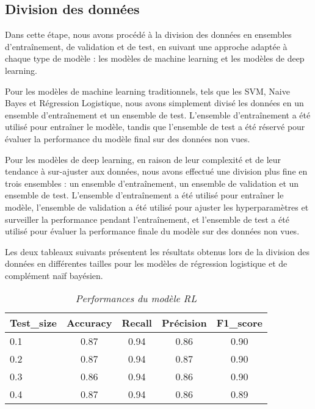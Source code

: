  
\subsection{Division des données}
Dans cette étape, nous avons procédé à la division des données en ensembles d'entraînement, de validation et de test, en suivant une approche adaptée à chaque type de modèle : les modèles de machine learning et les modèles de deep learning.

Pour les modèles de machine learning traditionnels, tels que les SVM, Naive Bayes et Régression Logistique, nous avons simplement divisé les données en un ensemble d'entraînement et un ensemble de test. L'ensemble d'entraînement a été utilisé pour entraîner le modèle, tandis que l'ensemble de test a été réservé pour évaluer la performance du modèle final sur des données non vues.

Pour les modèles de deep learning, en raison de leur complexité et de leur tendance à sur-ajuster aux données, nous avons effectué une division plus fine en trois ensembles : un ensemble d'entraînement, un ensemble de validation et un ensemble de test. L'ensemble d'entraînement a été utilisé pour entraîner le modèle, l'ensemble de validation a été utilisé pour ajuster les hyperparamètres et surveiller la performance pendant l'entraînement, et l'ensemble de test a été utilisé pour évaluer la performance finale du modèle sur des données non vues.

Les deux tableaux suivants présentent les résultats obtenus lors de la division des données en différentes tailles pour les modèles de régression logistique et de complément naïf bayésien. 

\begin{table}[h!]
    \centering
    \caption{\textit{Performances du modèle RL}}
    \begin{tabular}{lcccc}
        \toprule
        Test\_size & Accuracy & Recall & Précision & F1\_score \\
        \midrule
        0.1 & 0.87 & 0.94 & 0.86 & 0.90 \\
        0.2 & 0.87 & 0.94 & 0.87 & 0.90 \\
        0.3 & 0.86 & 0.94 & 0.86 & 0.90 \\
        0.4 & 0.87 & 0.94 & 0.86 & 0.89 \\
        \bottomrule
    \end{tabular}
\end{table}


